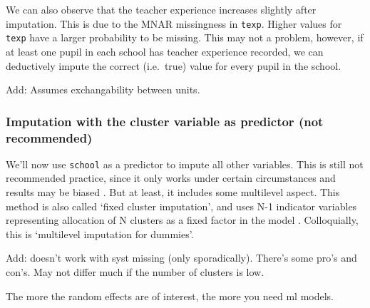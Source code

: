 \documentclass[
]{jss}
\begin{document}
We can also observe that the teacher experience increases slightly after
imputation. This is due to the MNAR missingness in \texttt{texp}. Higher
values for \texttt{texp} have a larger probability to be missing. This
may not a problem, however, if at least one pupil in each school has
teacher experience recorded, we can deductively impute the correct
(i.e.~true) value for every pupil in the school.

Add: Assumes exchangability between units.

\hypertarget{imputation-with-the-cluster-variable-as-predictor-not-recommended}{%
\subsubsection{Imputation with the cluster variable as predictor (not
recommended)}\label{imputation-with-the-cluster-variable-as-predictor-not-recommended}}

We'll now use \texttt{school} as a predictor to impute all other
variables. This is still not recommended practice, since it only works
under certain circumstances and results may be biased
\citep{drec15, ende16}. But at least, it includes some multilevel
aspect. This method is also called `fixed cluster imputation', and uses
N-1 indicator variables representing allocation of N clusters as a fixed
factor in the model \citep{reit06, ende16}. Colloquially, this is
`multilevel imputation for dummies'.

Add: doesn't work with syst missing (only sporadically). There's some
pro's and con's. May not differ much if the number of clusters is low.

The more the random effects are of interest, the more you need ml
models.

\begin{CodeChunk}
\end{CodeChunk}
\end{document}

